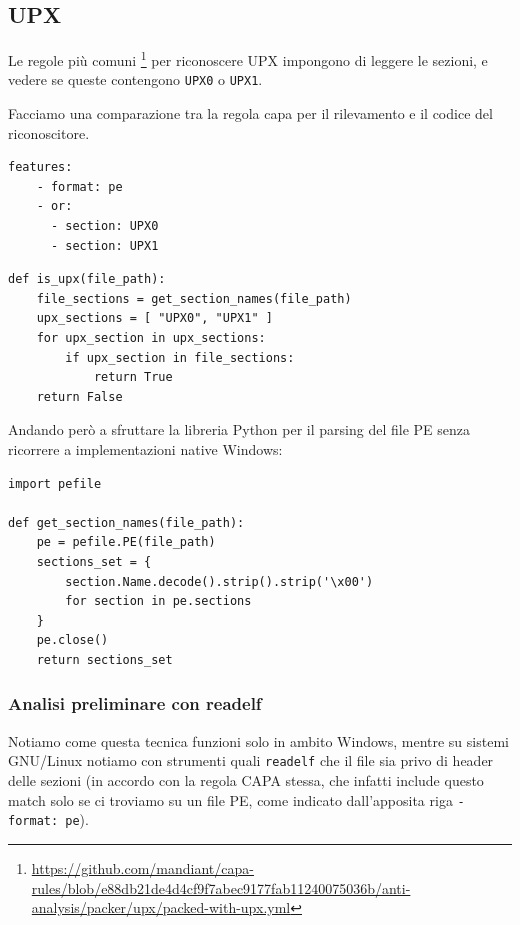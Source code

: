 \subsection{UPX}
Le regole più comuni
\footnote{\url{https://github.com/mandiant/capa-rules/blob/e88db21de4d4cf9f7abec9177fab11240075036b/anti-analysis/packer/upx/packed-with-upx.yml}}
per riconoscere UPX impongono di leggere le sezioni, e vedere se queste contengono \texttt{UPX0} o \texttt{UPX1}.

Facciamo una comparazione tra la regola capa per il rilevamento e il codice del riconoscitore.

\noindent\begin{minipage}{.35\textwidth}
       \begin{verbatim}
features:
    - format: pe
    - or:
      - section: UPX0
      - section: UPX1
       \end{verbatim}
\end{minipage}
\begin{minipage}{.4\textwidth}
       \begin{verbatim}
def is_upx(file_path):
    file_sections = get_section_names(file_path)
    upx_sections = [ "UPX0", "UPX1" ]
    for upx_section in upx_sections:
        if upx_section in file_sections:
            return True
    return False
       \end{verbatim}
\end{minipage}

\bigskip

Andando però a sfruttare la libreria Python per il parsing del file PE senza ricorrere a implementazioni native Windows:

\begin{verbatim}
import pefile

def get_section_names(file_path):
    pe = pefile.PE(file_path)
    sections_set = {
        section.Name.decode().strip().strip('\x00')
        for section in pe.sections
    }
    pe.close()
    return sections_set
\end{verbatim}

\subsubsection{Analisi preliminare con readelf}
Notiamo come questa tecnica funzioni solo in ambito Windows, mentre su sistemi GNU/Linux notiamo con strumenti quali \texttt{readelf} che il file sia privo di header delle sezioni
(in accordo con la regola CAPA stessa, che infatti include questo match solo se ci troviamo su un file PE, come indicato dall'apposita riga \texttt{- format: pe}).

